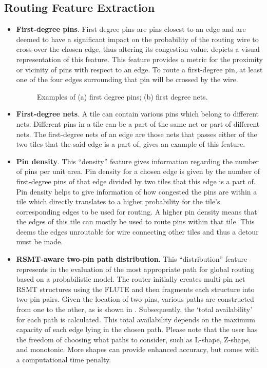 \subsection{Routing Feature Extraction}
\begin{itemize}
\item \textbf{First-degree pins}. First degree pins are pins closest to an edge and are deemed to have a significant impact on the probability of the routing wire to cross-over the chosen edge, thus altering its congestion value.  depicts a visual representation of this feature. This feature provides a metric for the proximity or vicinity of pins with respect to an edge. To route a first-degree pin, at least one of the four edges surrounding that pin will be crossed by the wire.

\begin{figure}[tb!]
    \centering
    \caption{Examples of (a) first degree pins; (b) first degree nets.}
\end{figure}

\item \textbf{First-degree nets}. A tile can contain various pins which belong to different nets. Different pins in a tile can be a part of the same net or part of different nets. The first-degree nets of an edge are those nets that passes either of the two tiles that the said edge is a part of,   gives an example of this feature. 

\item \textbf{Pin density}. This ``density'' feature gives information regarding the number of pins per unit area. Pin density for a chosen edge is given by the number of first-degree pins of that edge divided by two tiles that this edge is a part of. Pin density helps to give information of how congested the pins are within a tile which directly translates to a higher probability for the tile's corresponding edges to be used for routing. A higher pin density means that the edges of this tile can mostly be used to route pins within that tile. This deems the edges unroutable for wire connecting other tiles and thus a detour must be made. 

\item \textbf{RSMT-aware two-pin path distribution}. This ``distribution'' feature represents in the evaluation of the most appropriate path for global routing based on a probabilistic model. The router initially creates multi-pin net RSMT structures using the FLUTE \cite{FLUTE} and then fragments each structure into two-pin pairs. Given the location of two pins, various paths are constructed from one to the other, as is shown in . Subsequently, the ‘total availability’ for each path is calculated. This total availability depends on the maximum capacity of each edge lying in the chosen path. Please note that the user has the freedom of choosing what paths to consider, such as L-shape, Z-shape, and monotonic. More shapes can provide enhanced accuracy, but comes with a computational time penalty.


\end{itemize}
